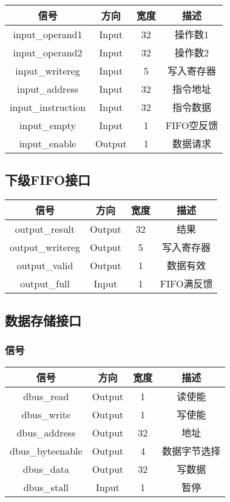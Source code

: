 \documentclass{article}
\newenvironment{signals}{
	\begin{center}
		\begin{tabular}{| c | c | c | c |}
			\hline
			信号 & 方向 & 宽度 & 描述 \\ \hline
}{
		\end{tabular}
	\end{center}
}
\newcommand\sigin{Input}
\newcommand\sigout{Output}
\begin{document}
\begin{signals}
	input\_operand1 & \sigin & 32 & 操作数1 \\ \hline
	input\_operand2 & \sigin & 32 & 操作数2 \\ \hline
	input\_writereg & \sigin & 5 & 写入寄存器 \\ \hline
	input\_address & \sigin & 32 & 指令地址 \\ \hline
	input\_instruction & \sigin & 32 & 指令数据 \\ \hline
	input\_empty & \sigin & 1 & FIFO空反馈 \\ \hline
	input\_enable & \sigout & 1 & 数据请求 \\ \hline
\end{signals}

\subsection{下级FIFO接口}

\begin{signals}
	output\_result & \sigout & 32 & 结果 \\ \hline
	output\_writereg & \sigout & 5 & 写入寄存器 \\ \hline
	output\_valid & \sigout & 1 & 数据有效 \\ \hline
	output\_full & \sigin & 1 & FIFO满反馈 \\ \hline
\end{signals}

\subsection{数据存储接口}

\subsubsection{信号}

\begin{signals}
	dbus\_read & \sigout & 1 & 读使能 \\ \hline
	dbus\_write & \sigout & 1 & 写使能 \\ \hline
	dbus\_address & \sigout & 32 & 地址 \\ \hline
	dbus\_byteenable & \sigout & 4 & 数据字节选择 \\ \hline
	dbus\_data & \sigout & 32 & 写数据 \\ \hline
	dbus\_stall & \sigin & 1 & 暂停 \\ \hline
\end{signals}
\end{document}
